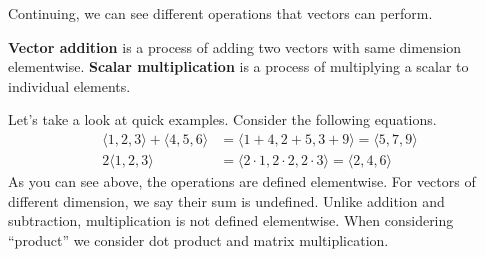 \documentclass[../main.tex]{subfiles}
\begin{document}
\begin{figure}[H]
\centering
{}
\end{figure}

Continuing, we can see different operations that vectors can perform.

\begin{definition}{}{}
\textbf{Vector addition} is a process of adding two vectors with
same dimension elementwise. \textbf{Scalar multiplication} is a
process of multiplying a scalar to individual elements.
\end{definition}

Let's take a look at quick examples. Consider the following equations.
\begin{align*}
    \langle 1, 2, 3 \rangle + \langle 4, 5, 6 \rangle
    &= \langle 1 + 4, 2 + 5, 3 + 9 \rangle
    = \langle 5, 7, 9 \rangle \\
    2 \langle 1, 2, 3 \rangle
    &= \langle 2 \cdot 1, 2 \cdot 2, 2 \cdot 3 \rangle
    = \langle 2, 4, 6 \rangle
\end{align*}
As you can see above, the operations are defined elementwise.
For vectors of different dimension, we say their sum is undefined.
Unlike addition and subtraction, multiplication is not defined
elementwise. When considering ``product'' we consider dot product
and matrix multiplication.
\end{document}
